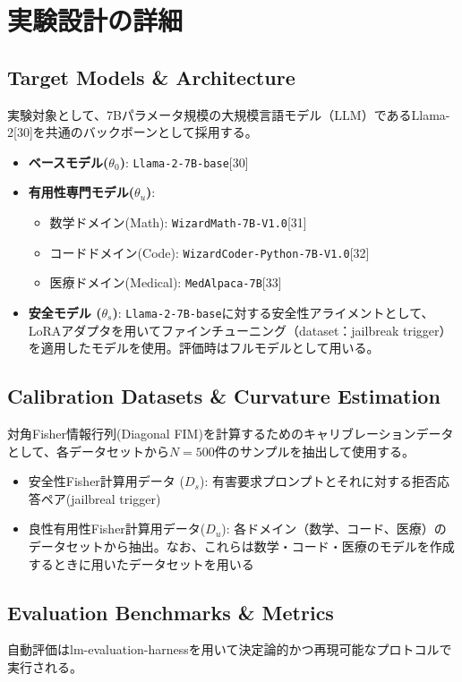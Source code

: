 \documentclass{article}
\begin{document}
\section{実験設計の詳細}
\subsection{Target Models \& Architecture}
実験対象として、7Bパラメータ規模の大規模言語モデル（LLM）であるLlama-2[30]を共通のバックボーンとして採用する。



\begin{itemize}
\item \textbf{ベースモデル($\theta_0$)}: \texttt{Llama-2-7B-base}[30]
\item \textbf{有用性専門モデル($\theta_u$)}:
\begin{itemize}
  \item 数学ドメイン(Math): \texttt{WizardMath-7B-V1.0}[31]
  \item コードドメイン(Code): \texttt{WizardCoder-Python-7B-V1.0}[32]
  \item 医療ドメイン(Medical): \texttt{MedAlpaca-7B}[33]
\end{itemize}
\item \textbf{安全モデル ($\theta_s$)}: \texttt{Llama-2-7B-base}に対する安全性アライメントとして、LoRAアダプタを用いてファインチューニング（dataset：jailbreak trigger）を適用したモデルを使用。評価時はフルモデルとして用いる。
\end{itemize}

\subsection{Calibration Datasets \& Curvature Estimation}
対角Fisher情報行列(Diagonal FIM)を計算するためのキャリブレーションデータとして、各データセットから$N=500$件のサンプルを抽出して使用する。
\begin{itemize}
\item 安全性Fisher計算用データ ($D_s$): 有害要求プロンプトとそれに対する拒否応答ペア(jailbreal trigger)
\item 良性有用性Fisher計算用データ($D_u$): 各ドメイン（数学、コード、医療）のデータセットから抽出。なお、これらは数学・コード・医療のモデルを作成するときに用いたデータセットを用いる
\end{itemize}

\subsection{Evaluation Benchmarks \& Metrics}
自動評価はlm-evaluation-harnessを用いて決定論的かつ再現可能なプロトコルで実行される。
\end{document}
